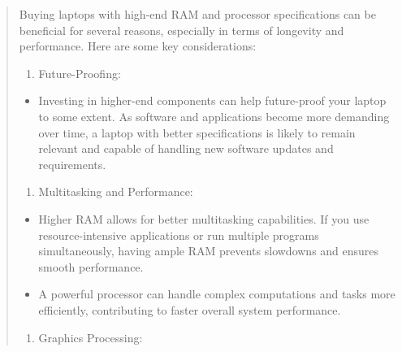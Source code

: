 \begin{leftbar} \begin{quote}
	Buying laptops with high-end RAM and processor specifications can be beneficial for several reasons, especially in terms of longevity and performance. Here are some key considerations:
	
	\begin{enumerate}[leftmargin=*]
		\def\labelenumi{\arabic{enumi}.}
		
		\item
		      Future-Proofing:
	\end{enumerate}
	
	\begin{itemize}
		
		\item
		      Investing in higher-end components can help future-proof your laptop to some extent. As software and applications become more demanding over time, a laptop with better specifications is likely to remain relevant and capable of handling new software updates and requirements.
	\end{itemize}
	
	\begin{enumerate}[leftmargin=*]
		\def\labelenumi{\arabic{enumi}.}
		\setcounter{enumi}{1}
		
		\item
		      Multitasking and Performance:
	\end{enumerate}
	
	\begin{itemize}
		
		\item
		      Higher RAM allows for better multitasking capabilities. If you use resource-intensive applications or run multiple programs simultaneously, having ample RAM prevents slowdowns and ensures smooth performance.
		\item
		      A powerful processor can handle complex computations and tasks more efficiently, contributing to faster overall system performance.
	\end{itemize}
	
	\begin{enumerate}[leftmargin=*]
		\def\labelenumi{\arabic{enumi}.}
		\setcounter{enumi}{2}
		
		\item
		      Graphics Processing:
	\end{enumerate}
	
	\begin{itemize}
		

\end{itemize}
\end{quote}
\end{leftbar}
